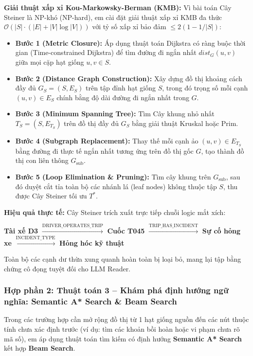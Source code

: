 \documentclass[a4paper,11pt]{article}
\begin{document}
\textbf{Giải thuật xấp xỉ Kou-Markowsky-Berman (KMB):}
Vì bài toán Cây Steiner là NP-khó (NP-hard), em cài đặt giải thuật xấp xỉ KMB đa thức $\mathcal{O}(|S| \cdot (|E| + |V|\log |V|))$ với tỷ số xấp xỉ bảo đảm $\le 2(1 - 1/|S|)$:
\begin{itemize}[leftmargin=1.5em]
    \item \textbf{Bước 1 (Metric Closure):} Áp dụng thuật toán Dijkstra có ràng buộc thời gian (Time-constrained Dijkstra) để tìm đường đi ngắn nhất $dist_G(u, v)$ giữa mọi cặp hạt giống $u, v \in S$.
    \item \textbf{Bước 2 (Distance Graph Construction):} Xây dựng đồ thị khoảng cách đầy đủ $G_S = (S, E_S)$ trên tập đỉnh hạt giống $S$, trong đó trọng số mỗi cạnh $(u, v) \in E_S$ chính bằng độ dài đường đi ngắn nhất trong $G$.
    \item \textbf{Bước 3 (Minimum Spanning Tree):} Tìm Cây khung nhỏ nhất $T_S = (S, E_{T_S})$ trên đồ thị đầy đủ $G_S$ bằng giải thuật Kruskal hoặc Prim.
    \item \textbf{Bước 4 (Subgraph Replacement):} Thay thế mỗi cạnh ảo $(u, v) \in E_{T_S}$ bằng đường đi thực tế ngắn nhất tương ứng trên đồ thị gốc $G$, tạo thành đồ thị con liên thông $G_{\text{sub}}$.
    \item \textbf{Bước 5 (Loop Elimination \& Pruning):} Tìm cây khung trên $G_{\text{sub}}$, sau đó duyệt cắt tỉa toàn bộ các nhánh lá (leaf nodes) không thuộc tập $S$, thu được Cây Steiner tối ưu $T^*$.
\end{itemize}

\textbf{Hiệu quả thực tế:} Cây Steiner trích xuất trực tiếp chuỗi logic mắt xích:
\begin{center}
\textbf{Tài xế D3} $\xrightarrow{\text{DRIVER\_OPERATES\_TRIP}}$ \textbf{Cuốc T045} $\xrightarrow{\text{TRIP\_HAS\_INCIDENT}}$ \textbf{Sự cố hỏng xe} $\xrightarrow{\text{INCIDENT\_TYPE}}$ \textbf{Hỏng hóc kỹ thuật}
\end{center}
Toàn bộ các cạnh dư thừa xung quanh hoàn toàn bị loại bỏ, mang lại tập bằng chứng cô đọng tuyệt đối cho LLM Reader.

\subsubsection{Hợp phần 2: Thuật toán 3 -- Khám phá định hướng ngữ nghĩa: Semantic A* Search \& Beam Search}
\label{sec:algo-beam}

Trong các trường hợp cần mở rộng đồ thị từ 1 hạt giống nguồn đến các nút thuộc tính chưa xác định trước (ví dụ: tìm các khoản bồi hoàn hoặc vi phạm chưa rõ mã số), em áp dụng thuật toán tìm kiếm có định hướng \textbf{Semantic A* Search} kết hợp \textbf{Beam Search}.
\end{document}
